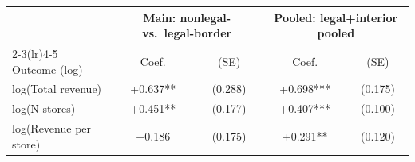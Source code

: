 \begin{tabular}{@{}lcccc@{}}
\toprule
 & \multicolumn{2}{c}{Main: nonlegal- vs.\ legal-border} & \multicolumn{2}{c}{Pooled: legal+interior pooled} \\
\cmidrule(lr){2-3}\cmidrule(lr){4-5}
Outcome (log) & Coef. & (SE) & Coef. & (SE) \\
\midrule
log(Total revenue) & +0.637** & (0.288) & +0.698*** & (0.175) \\
log(N stores) & +0.451** & (0.177) & +0.407*** & (0.100) \\
log(Revenue per store) & +0.186 & (0.175) & +0.291** & (0.120) \\
\bottomrule
\end{tabular}
